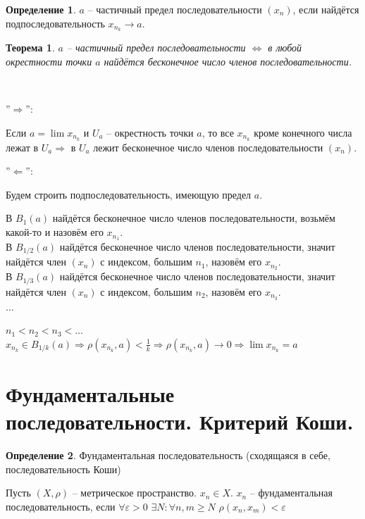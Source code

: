 \documentclass[12pt,letterpaper]{report}
\makeatletter
\newtheorem*{theorem-non}{Теорема}
\theoremstyle{definition}
\newtheorem*{conj}{Определение}
\renewenvironment{proof}[1][\proofname]{%
   \par\pushQED{\qed}\normalfont%
   \topsep6\p@\@plus6\p@\relax
   \trivlist\item[\hskip\labelsep\bfseries#1\@addpunct{.}]%
   \ignorespaces
}{%
   \popQED\endtrivlist\@endpefalse
}
\makeatother
\begin{document}
    \begin{conj}
    $a$ -- частичный предел последовательности $(x_n)$, если найдётся
    подпоследовательность $x_{n_k} \rightarrow a$.
    \end{conj}
    \begin{theorem-non}
    $a$ -- частичный предел последовательности $\Leftrightarrow$
    в любой окрестности точки $a$ найдётся бесконечное число членов
    последовательности.
    \end{theorem-non}
    \begin{proof} $ $
    
        ''$\Longrightarrow$'':
    
        Если $a = \lim x_{n_k}$ и $U_a$ -- окрестность точки $a$, то
        все $x_{n_k}$ кроме конечного числа лежат в $U_a \Rightarrow$
        в $U_a$ лежит бесконечное число членов последовательности $(x_n)$.
    
        ''$\Longleftarrow$'':
    
        Будем строить подпоследовательность, имеющую предел $a$.
    
        В $B_{1}(a)$ найдётся бесконечное число членов последовательности,
        возьмём какой-то и назовём его $x_{n_1}$.\\
        В $B_{1/2}(a)$ найдётся бесконечное число членов
        последовательности, значит найдётся член $(x_n)$ с индексом, большим
        $n_1$, назовём его $x_{n_2}$.\\
        В $B_{1/3}(a)$ найдётся бесконечное число членов
        последовательности, значит найдётся член $(x_n)$ с индексом, большим
        $n_2$, назовём его $x_{n_3}$.\\
        $\dots$
    
        $n_1 < n_2 < n_3 < \dots$\\
        $x_{n_k} \in B_{1/k}(a) \Rightarrow \rho(x_{n_k}, a) < \frac1k
        \Rightarrow \rho(x_{n_k}, a) \rightarrow 0 \Rightarrow
        \lim x_{n_k} = a$
    
    \end{proof}
    
    \section{Фундаментальные последовательности. Критерий Коши.}
    
    \begin{conj}
    Фундаментальная последовательность (сходящаяся в себе,
    последовательность Коши)
    \end{conj}
    Пусть $(X, \rho)$ -- метрическое пространство. $x_n \in X$.
    $x_n$ -- фундаментальная последовательность, если $\forall
    \varepsilon > 0 \,\, \exists N : \forall n, m \geq N \,\,
    \rho(x_n, x_m) < \varepsilon$
    
\end{document}
